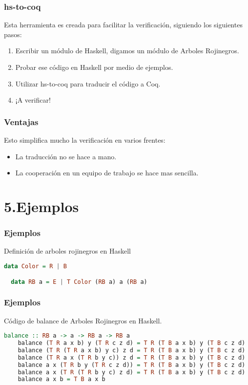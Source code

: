 \documentclass[xcolor=dvipsnames,table,handout]{beamer}
\begin{document}
\begin{frame}
  \frametitle{hs-to-coq}
        Esta herramienta es creada para facilitar la verificación, siguiendo los siguientes pasos:
        \begin{enumerate}
            \item Escribir un módulo de Haskell, digamos un módulo de Arboles Rojinegros.
            \item Probar ese código en Haskell por medio de ejemplos.
            \item Utilizar hs-to-coq para traducir el código a Coq.
            \item ¡A verificar!
        \end{enumerate}
\end{frame}


\begin{frame}[fragile]
  \frametitle{Ventajas}
        Esto simplifica mucho la verificación en varios frentes:
         \begin{itemize}
            \item La traducción no se hace a mano.
            \item La cooperación en un equipo de trabajo se hace mas sencilla.
        \end{itemize}
\end{frame}
\section{5.Ejemplos}

\begin{frame}[fragile]
  \frametitle{Ejemplos}

  Definición de arboles rojinegros en Haskell
  \begin{lstlisting}[language=haskell]
  data Color = R | B

  data RB a = E | T Color (RB a) a (RB a)
  \end{lstlisting}

\end{frame}

\begin{frame}[fragile]
  \frametitle{Ejemplos}
  Código de balance de Arboles Rojinegros en Haskell.
       \begin{lstlisting}[language=haskell]
    balance :: RB a -> a -> RB a -> RB a
    balance (T R a x b) y (T R c z d) = T R (T B a x b) y (T B c z d)
    balance (T R (T R a x b) y c) z d = T R (T B a x b) y (T B c z d)
    balance (T R a x (T R b y c)) z d = T R (T B a x b) y (T B c z d)
    balance a x (T R b y (T R c z d)) = T R (T B a x b) y (T B c z d)
    balance a x (T R (T R b y c) z d) = T R (T B a x b) y (T B c z d)
    balance a x b = T B a x b
       \end{lstlisting}
\end{frame}
\end{document}
